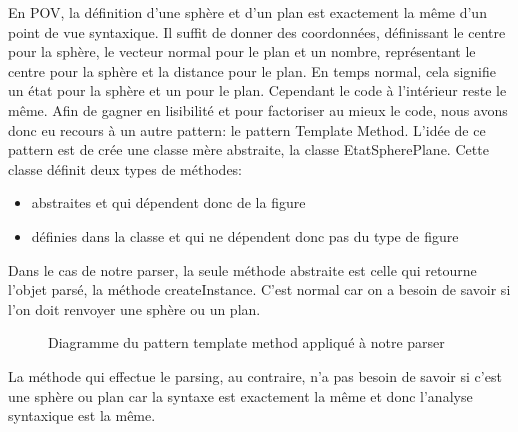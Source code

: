 \documentclass[../../Rapport RayTracer]{subfiles}
\begin{document}
En POV, la définition d'une sphère et d'un plan est exactement la même d'un point de vue syntaxique. Il suffit de donner des coordonnées, définissant le centre pour la sphère, le vecteur normal pour le plan et un nombre, représentant le centre pour la sphère et la distance pour le plan. En temps normal, cela signifie un état pour la sphère et un pour le plan. Cependant le code à l'intérieur reste le même.
Afin de gagner en lisibilité et pour factoriser au mieux le code, nous avons donc eu recours à un autre pattern: le pattern Template Method. L'idée de ce pattern est de crée une classe mère abstraite, la classe EtatSpherePlane. Cette classe définit deux types de méthodes:

\begin{itemize}
\item abstraites et qui dépendent donc de la figure
\item définies dans la classe et qui ne dépendent donc pas du type de figure
\end{itemize}

Dans le cas de notre parser, la seule méthode abstraite est celle qui retourne l'objet parsé, la méthode createInstance. C'est normal car on a besoin de savoir si l'on doit renvoyer une sphère ou un plan.

\begin{figure}[h!]
	
	\caption{Diagramme du pattern template method appliqué à notre parser}
	\label{diagrammePatternTemplateMethod}
\end{figure}
\FloatBarrier

La méthode qui effectue le parsing, au contraire,  n'a pas besoin de savoir si c'est une sphère ou plan car la syntaxe est exactement la même et donc l'analyse syntaxique est la même.
\end{document}
